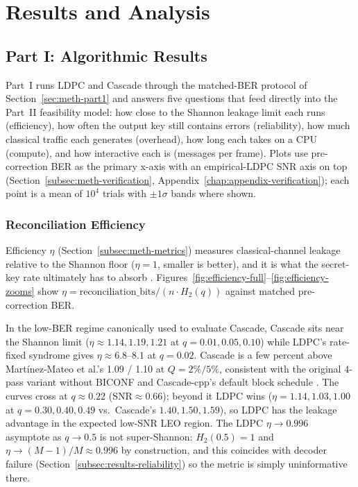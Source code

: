 \documentclass{UoYCSproject}
\begin{document}
\chapter{Results and Analysis}
\label{cha:results}

\section{Part I: Algorithmic Results}
\label{sec:results-part1}

Part~I runs LDPC and Cascade through the matched-BER protocol of
Section~\ref{sec:meth-part1} and answers five questions that feed
directly into the Part~II feasibility model: how close to the
Shannon leakage limit each runs (efficiency), how often the output key
still contains errors (reliability), how much classical traffic each
generates (overhead), how long each takes on a CPU (compute), and how
interactive each is (messages per frame). Plots use pre-correction BER as
the primary x-axis with an empirical-LDPC SNR axis on top
(Section~\ref{subsec:meth-verification},
Appendix~\ref{chap:appendix-verification}); each point is a mean of $10^4$
trials with $\pm 1\sigma$ bands where shown.

\FloatBarrier
\subsection{Reconciliation Efficiency}
\label{subsec:results-efficiency}

Efficiency $\eta$ (Section~\ref{subsec:meth-metrics}) measures
classical-channel leakage relative to the Shannon floor ($\eta = 1$,
smaller is better), and it is what the secret-key rate ultimately has to
absorb \cite{braunstein2005quantum}. Figures~\ref{fig:efficiency-full}--\ref{fig:efficiency-zooms}
show $\eta = \mathrm{reconciliation\_bits} / (n \cdot H_2(q))$ against
matched pre-correction BER.

In the low-BER regime canonically used to evaluate Cascade, Cascade sits
near the Shannon limit ($\eta \approx 1.14, 1.19, 1.21$ at
$q = 0.01, 0.05, 0.10$) while LDPC's rate-fixed syndrome gives
$\eta \approx 6.8\text{--}8.1$ at $q = 0.02$. Cascade is a few percent
above Mart\'inez-Mateo et al.'s 1.09 / 1.10 at $Q = 2\%/5\%$, consistent
with the original 4-pass variant without BICONF and Cascade-cpp's default
block schedule \cite{martinez-mateo_demystifying_2015}. The curves cross
at $q \approx 0.22$ ($\mathrm{SNR}\!\approx\!0.66$); beyond it LDPC wins
($\eta = 1.14, 1.03, 1.00$ at $q = 0.30, 0.40, 0.49$ vs.\ Cascade's
$1.40, 1.50, 1.59$), so LDPC has the leakage advantage in the expected
low-SNR LEO region. The LDPC $\eta \to 0.996$ asymptote as $q \to 0.5$
is not super-Shannon: $H_2(0.5) = 1$ and
$\eta \to (M-1)/M \approx 0.996$ by construction, and this coincides
with decoder failure (Section~\ref{subsec:results-reliability}) so the
metric is simply uninformative there.
\end{document}
